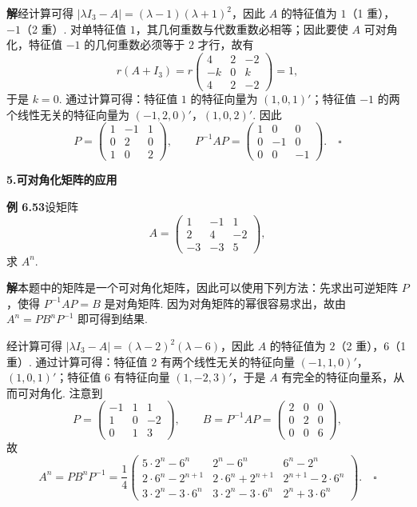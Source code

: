 \documentclass[UTF8, 12pt, fontset=fandol, oneside]{ctexart}
\begin{document}
\noindent\textbf{解}\quad 经计算可得 $|\lambda I_3-A|=(\lambda-1)(\lambda+1)^2$，因此 $A$ 的特征值为 $1$（1 重），$-1$（2 重）. 对单特征值 $1$，其几何重数与代数重数必相等；因此要使 $A$ 可对角化，特征值 $-1$ 的几何重数必须等于 $2$ 才行，故有
\[
r(A+I_3)=r\left(\begin{array}{ccc}
4 & 2 & -2\\
-k & 0 & k\\
4 & 2 & -2
\end{array}\right)=1,
\]
于是 $k=0$. 通过计算可得：特征值 $1$ 的特征向量为 $(1,0,1)'$；特征值 $-1$ 的两个线性无关的特征向量为 $(-1,2,0)'$，$(1,0,2)'$. 因此
\[
P=\left(\begin{array}{ccc}
1 & -1 & 1\\
0 & 2 & 0\\
1 & 0 & 2
\end{array}\right),\qquad
P^{-1}AP=\left(\begin{array}{ccc}
1 & 0 & 0\\
0 & -1 & 0\\
0 & 0 & -1
\end{array}\right). \quad \square
\]

\noindent\textbf{5.\quad 可对角化矩阵的应用}

\noindent\textbf{例 6.53}\quad 设矩阵
\[
A=\left(\begin{array}{ccc}
1 & -1 & 1\\
2 & 4 & -2\\
-3 & -3 & 5
\end{array}\right),
\]
求 $A^n$.

\noindent\textbf{解}\quad 本题中的矩阵是一个可对角化矩阵，因此可以使用下列方法：先求出可逆矩阵 $P$，使得 $P^{-1}AP=B$ 是对角矩阵. 因为对角矩阵的幂很容易求出，故由 $A^n=PB^nP^{-1}$ 即可得到结果.

经计算可得 $|\lambda I_3-A|=(\lambda-2)^2(\lambda-6)$，因此 $A$ 的特征值为 $2$（2 重），$6$（1 重）. 通过计算可得：特征值 $2$ 有两个线性无关的特征向量 $(-1,1,0)'$，$(1,0,1)'$；特征值 $6$
有特征向量 $(1,-2,3)'$，于是 $A$ 有完全的特征向量系，从而可对角化. 注意到
\[
P=\left(\begin{array}{ccc}
-1 & 1 & 1\\
1 & 0 & -2\\
0 & 1 & 3
\end{array}\right),\qquad
B=P^{-1}AP=\left(\begin{array}{ccc}
2 & 0 & 0\\
0 & 2 & 0\\
0 & 0 & 6
\end{array}\right),
\]
故
\[
A^n=PB^nP^{-1}
=\frac{1}{4}\left(\begin{array}{ccc}
5\cdot 2^n-6^n & 2^n-6^n & 6^n-2^n\\
2\cdot 6^n-2^{n+1} & 2\cdot 6^n+2^{n+1} & 2^{n+1}-2\cdot 6^n\\
3\cdot 2^n-3\cdot 6^n & 3\cdot 2^n-3\cdot 6^n & 2^n+3\cdot 6^n
\end{array}\right). \quad \square
\]
\end{document}
